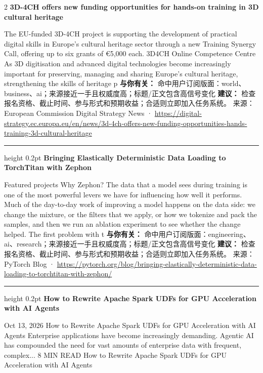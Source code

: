 \documentclass[10.5pt]{ctexart}
\begin{document}
\begin{multicols}{2}
{\large\bfseries 3D-4CH offers new funding opportunities for hands-on training in 3D cultural heritage}\par
The EU-funded 3D-4CH project is supporting the development of practical digital skills in Europe's cultural heritage sector through a new Training Synergy Call, offering up to six grants of €5,000 each. 3D4CH Online Competence Centre As 3D digitisation and advanced digital technologies become increasingly important for preserving, managing and sharing Europe's cultural heritage, strengthening the skills of heritage p
\textbf{与你有关：} 命中用户订阅版面：world、business、ai；来源接近一手且权威度高；标题/正文包含高信号变化
\textbf{建议：} 检查报名资格、截止时间、参与形式和预期收益；合适则立即加入任务系统。
{\footnotesize\color{ormuted} 来源：European Commission Digital Strategy News · \url{https://digital-strategy.ec.europa.eu/en/news/3d-4ch-offers-new-funding-opportunities-hands-training-3d-cultural-heritage}}
\vspace{2mm}
\hrule height 0.2pt
\vspace{2mm}
{\large\bfseries Bringing Elastically Deterministic Data Loading to TorchTitan with Zephon}\par
Featured projects Why Zephon? The data that a model sees during training is one of the most powerful levers we have for influencing how well it performs. Much of the day-to-day work of improving a model happens on the data side: we change the mixture, or the filters that we apply, or how we tokenize and pack the samples, and then we run an ablation experiment to see whether the change helped. The first problem with t
\textbf{与你有关：} 命中用户订阅版面：engineering、ai、research；来源接近一手且权威度高；标题/正文包含高信号变化
\textbf{建议：} 检查报名资格、截止时间、参与形式和预期收益；合适则立即加入任务系统。
{\footnotesize\color{ormuted} 来源：PyTorch Blog · \url{https://pytorch.org/blog/bringing-elastically-deterministic-data-loading-to-torchtitan-with-zephon/}}
\vspace{2mm}
\hrule height 0.2pt
\vspace{2mm}
{\large\bfseries How to Rewrite Apache Spark UDFs for GPU Acceleration with AI Agents}\par
Oct 13, 2026 How to Rewrite Apache Spark UDFs for GPU Acceleration with AI Agents Enterprise applications have become increasingly demanding. Agentic AI has compounded the need for vast amounts of enterprise data with frequent, complex... 8 MIN READ How to Rewrite Apache Spark UDFs for GPU Acceleration with AI Agents

\end{multicols}
\end{document}
